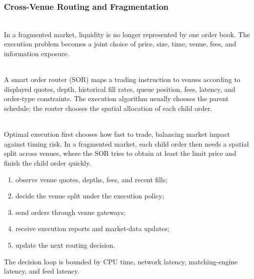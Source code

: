 \subsubsection{Cross-Venue Routing and Fragmentation}

\begin{principle} \\
In a fragmented market, liquidity is no longer represented by one order book. The execution problem becomes a joint choice of price, size, time, venue, fees, and information exposure.
\end{principle}

\begin{definition} \\
A smart order router (SOR) maps a trading instruction to venues according to displayed quotes, depth, historical fill rates, queue position, fees, latency, and order-type constraints. The execution algorithm usually chooses the parent schedule; the router chooses the spatial allocation of each child order.
\end{definition}

\begin{principle} \\
Optimal execution first chooses how fast to trade, balancing market impact against timing risk. In a fragmented market, each child order then needs a spatial split across venues, where the SOR tries to obtain at least the limit price and finish the child order quickly.
\end{principle}

\begin{process} 
\begin{enumerate}[label=\roman*.]
\setlength{\itemsep}{0pt}
\item observe venue quotes, depths, fees, and recent fills;
\item decide the venue split under the execution policy;
\item send orders through venue gateways;
\item receive execution reports and market-data updates;
\item update the next routing decision.
\end{enumerate}
The decision loop is bounded by CPU time, network latency, matching-engine latency, and feed latency.
\end{process}

